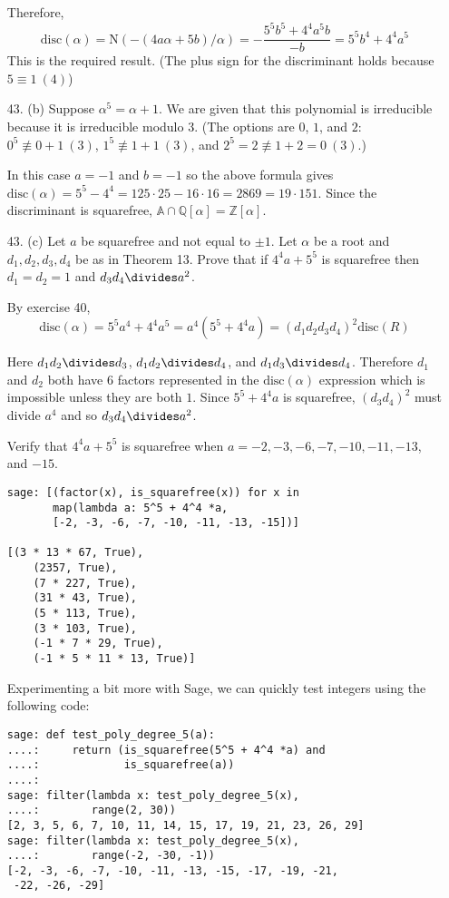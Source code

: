 \documentclass{article}
\newcommand{\Q}[0]{\mathbb{Q}}
\newcommand{\Z}[0]{\mathbb{Z}}
\newcommand{\norm}[1]{\text{N}(#1)}
\newcommand{\disc}[1]{\text{disc}(#1)}
\begin{document}
\begin{enumerate}
Therefore, \[ \disc{\alpha} = \norm{-(4a\alpha + 5b)/\alpha} = -\frac{5^5 b^5 + 4^4 a^5 b}{-b} = 5^5 b^4 + 4^4 a^5 \]  This is the required result.  (The plus sign for the discriminant holds because $5 \equiv 1\ (4)$)

\item [43. (b)] Suppose $\alpha^5 = \alpha + 1$.  We are given that this polynomial is irreducible because it is irreducible modulo 3.  (The options are $0$, $1$, and $2$: $0^5 \not\equiv 0 + 1\ (3)$, $1^5 \not\equiv 1 + 1\ (3)$, and $2^5 = 2 \not\equiv 1 + 2 = 0\ (3)$.)

In this case $a = -1$ and $b = -1$ so the above formula gives $\disc{\alpha} = 5^5 - 4^4 = 125 \cdot 25 - 16 \cdot 16 = 2869 = 19 \cdot 151$.  Since the discriminant is squarefree, $\mathbb{A} \cap \Q[\alpha] = \Z[\alpha]$.

\item[43. (c)] Let $a$ be squarefree and not equal to $\pm 1$.  Let $\alpha$ be a root and $d_1, d_2, d_3, d_4$ be as in Theorem 13.  Prove that if $4^4 a + 5^5$ is squarefree then $d_1 = d_2 = 1$ and $d_3 d_4 \divides a^2$.

By exercise 40, \[ \disc{\alpha} = 5^5 a^4 + 4^4 a^5 = a^4(5^5 + 4^4 a) =(d_1 d_2 d_3 d_4)^2 \disc{R} \]

Here $d_1 d_2 \divides d_3$, $d_1 d_2 \divides d_4$, and $d_1 d_3 \divides d_4$.  Therefore $d_1$ and $d_2$ both have 6 factors represented in the $\disc{\alpha}$ expression which is impossible unless they are both $1$.  Since $5^5 + 4^4 a$ is squarefree, $(d_3 d_4)^2$ must divide $a^4$ and so $d_3 d_4 \divides a^2$.

Verify that $4^4 a + 5^5$ is squarefree when $a = -2, -3, -6, -7, -10, -11, -13$, and $-15$.

\begin{verbatim}
sage: [(factor(x), is_squarefree(x)) for x in
       map(lambda a: 5^5 + 4^4 *a,
       [-2, -3, -6, -7, -10, -11, -13, -15])]

[(3 * 13 * 67, True),
    (2357, True),
    (7 * 227, True),
    (31 * 43, True),
    (5 * 113, True),
    (3 * 103, True),
    (-1 * 7 * 29, True),
    (-1 * 5 * 11 * 13, True)]
    \end{verbatim}

    Experimenting a bit more with Sage, we can quickly test integers using the following code:
    \begin{verbatim}
sage: def test_poly_degree_5(a):
....:     return (is_squarefree(5^5 + 4^4 *a) and
....:             is_squarefree(a))
....:
sage: filter(lambda x: test_poly_degree_5(x),
....:        range(2, 30))
[2, 3, 5, 6, 7, 10, 11, 14, 15, 17, 19, 21, 23, 26, 29]
sage: filter(lambda x: test_poly_degree_5(x),
....:        range(-2, -30, -1))
[-2, -3, -6, -7, -10, -11, -13, -15, -17, -19, -21,
 -22, -26, -29]
\end{verbatim}


\end{enumerate}
\end{document}
